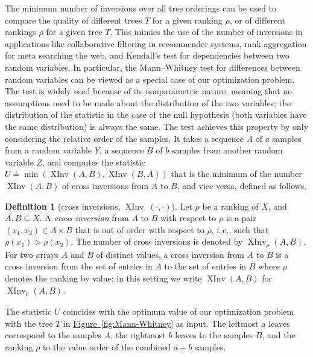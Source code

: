 \documentclass[11pt]{article}
\numberwithin{equation}{section}
\theoremstyle{definition}
\newtheorem{definition}[theorem]{Definition}
\theoremstyle{plain}
\newcommand{\ie}{i.\,e.}
\newcommand{\expref}[2]{\hyperref[#2]{#1~\ref{#2}}}
\newcommand{\ranking}{\rho}
\DeclareMathOperator{\XInv}{XInv}
\begin{document}
The minimum number of inversions over all tree orderings %
%
can be used to compare the quality of different trees $T$ for a given ranking $\ranking$, or of different rankings $\ranking$ for a given tree $T$. This mimics the use of the number of inversions in applications like collaborative filtering in recommender systems, rank aggregation for meta searching the web, and Kendall's test for dependencies between two random variables. 
In particular, the Mann--Whitney test for differences between random variables can be viewed as a special case of our optimization problem. The test is widely used because of its nonparametric nature, meaning that no assumptions need to be made about the distribution of the two variables; the distribution of the statistic in the case of the null hypothesis (both variables have the same distribution) is always the same. The test achieves this property by only considering the relative order of the samples. It takes a sequence $A$ of $a$ samples from a random variable $Y$, a sequence $B$ of $b$ samples from another random variable $Z$, and computes the statistic $U \doteq \min(\XInv(A,B),\XInv(B,A))$ that is the minimum of the number $\XInv(A,B)$ of cross inversions from $A$ to $B$, and vice versa, defined as follows.  %
%
\begin{definition}[cross inversions, $\XInv_{\cdot}(\cdot,\cdot)$]
Let $\ranking$ be a ranking of $X$, and $A, B \subseteq X$. A \emph{cross inversion} from $A$ to $B$ with respect to $\ranking$ is a pair $(x_1,x_2) \in A \times B$ that is out of order with respect to $\ranking$, \ie, such that $\ranking(x_1) > \ranking(x_2)$. The number of cross inversions is denoted by $\XInv_\ranking(A,B)$.
For two arrays $A$ and $B$ of
%
%
distinct values, a cross inversion from $A$ to $B$ is a cross inversion from the set of entries in $A$ to the set of entries in $B$ where $\ranking$ denotes the ranking by value; in this setting we write $\XInv(A,B)$ for $\XInv_\ranking(A,B)$.
\end{definition}
The statistic $U$ coincides with the optimum value of our optimization problem with the tree $T$ in \expref{Figure}{fig:Mann-Whitney} as input. The leftmost $a$ leaves correspond to the samples $A$, the rightmost $b$ leaves to the samples $B$, and the ranking $\ranking$ to the value order of the combined $a+b$ samples.
\end{document}
